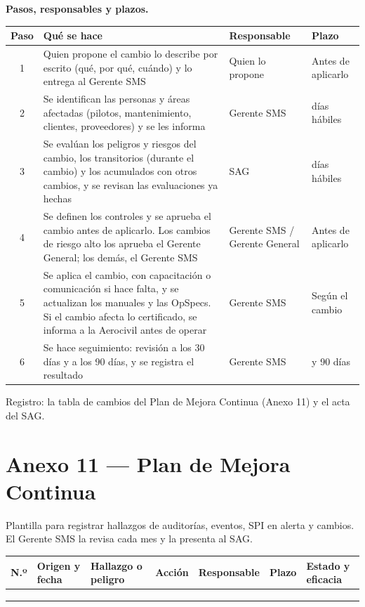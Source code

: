 \textbf{Pasos, responsables y plazos.}
\begin{longtable}{|c|>{\RaggedRight\arraybackslash}p{7.8cm}|>{\RaggedRight\arraybackslash}p{3.2cm}|>{\RaggedRight\arraybackslash}p{2.4cm}|}
\hline
\rowcolor[gray]{0.9}\textbf{Paso} & \textbf{Qué se hace} & \textbf{Responsable} & \textbf{Plazo} \\ \hline
\endhead
1 & Quien propone el cambio lo describe por escrito (qué, por qué, cuándo) y lo entrega al Gerente SMS & Quien lo propone & Antes de aplicarlo \\ \hline
2 & Se identifican las personas y áreas afectadas (pilotos, mantenimiento, clientes, proveedores) y se les informa & Gerente SMS & 5 días hábiles \\ \hline
3 & Se evalúan los peligros y riesgos del cambio, los transitorios (durante el cambio) y los acumulados con otros cambios, y se revisan las evaluaciones ya hechas & SAG & 10 días hábiles \\ \hline
4 & Se definen los controles y se aprueba el cambio antes de aplicarlo. Los cambios de riesgo alto los aprueba el Gerente General; los demás, el Gerente SMS & Gerente SMS / Gerente General & Antes de aplicarlo \\ \hline
5 & Se aplica el cambio, con capacitación o comunicación si hace falta, y se actualizan los manuales y las OpSpecs. Si el cambio afecta lo certificado, se informa a la Aerocivil antes de operar & Gerente SMS & Según el cambio \\ \hline
6 & Se hace seguimiento: revisión a los 30 días y a los 90 días, y se registra el resultado & Gerente SMS & 30 y 90 días \\ \hline
\end{longtable}
Registro: la tabla de cambios del Plan de Mejora Continua (Anexo 11) y el acta del SAG.

\clearpage
\section*{Anexo 11 --- Plan de Mejora Continua}
Plantilla para registrar hallazgos de auditorías, eventos, SPI en alerta y cambios. El Gerente SMS la revisa cada mes y la presenta al SAG.

\begin{longtable}{|>{\RaggedRight\arraybackslash}p{0.8cm}|>{\RaggedRight\arraybackslash}p{2.4cm}|>{\RaggedRight\arraybackslash}p{2.8cm}|>{\RaggedRight\arraybackslash}p{2.8cm}|>{\RaggedRight\arraybackslash}p{1.9cm}|>{\RaggedRight\arraybackslash}p{1.9cm}|>{\RaggedRight\arraybackslash}p{1.9cm}|}
\hline
\rowcolor[gray]{0.9}\textbf{N.º} & \textbf{Origen y fecha} & \textbf{Hallazgo o peligro} & \textbf{Acción} & \textbf{Responsable} & \textbf{Plazo} & \textbf{Estado y eficacia} \\ \hline
\endhead
 & & & & & & \\[1.2cm] \hline
 & & & & & & \\[1.2cm] \hline
 & & & & & & \\[1.2cm] \hline
\end{longtable}

